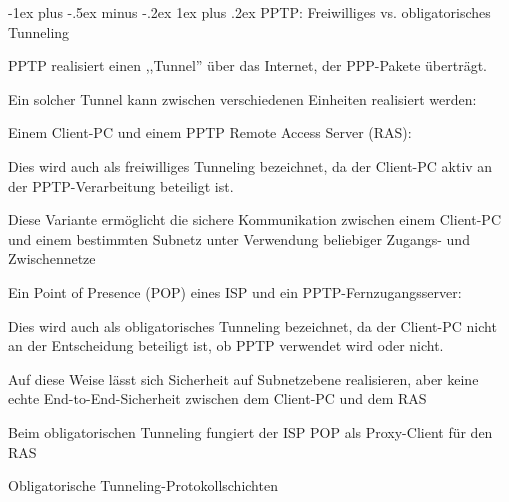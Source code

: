\documentclass[a4paper]{article}
\makeatletter
\renewcommand{\subsubsection}{\@startsection{subsubsection}{3}{0mm}%
 {-1ex plus -.5ex minus -.2ex}%
 {1ex plus .2ex}%
 {\normalfont\small\bfseries}}
\makeatother
\begin{document}
\begin{multicols}{3}
      \subsubsection{PPTP: Freiwilliges vs. obligatorisches Tunneling}
      \begin{itemize*}
            \item PPTP realisiert einen ,,Tunnel'' über das Internet, der PPP-Pakete überträgt.
            \item Ein solcher Tunnel kann zwischen verschiedenen Einheiten realisiert werden:
            \begin{itemize*}
                  \item Einem Client-PC und einem PPTP Remote Access Server (RAS):
                  \begin{itemize*}
                        \item Dies wird auch als freiwilliges Tunneling bezeichnet, da der Client-PC aktiv an der PPTP-Verarbeitung beteiligt ist.
                        \item Diese Variante ermöglicht die sichere Kommunikation zwischen einem Client-PC und einem bestimmten Subnetz unter Verwendung beliebiger Zugangs- und Zwischennetze
                  \end{itemize*}
                  \item Ein Point of Presence (POP) eines ISP und ein PPTP-Fernzugangsserver:
                  \begin{itemize*}
                        \item Dies wird auch als obligatorisches Tunneling bezeichnet, da der Client-PC nicht an der Entscheidung beteiligt ist, ob PPTP verwendet wird oder nicht.
                        \item Auf diese Weise lässt sich Sicherheit auf Subnetzebene realisieren, aber keine echte End-to-End-Sicherheit zwischen dem Client-PC und dem RAS
                        \item Beim obligatorischen Tunneling fungiert der ISP POP als Proxy-Client für den RAS
                  \end{itemize*}
            \end{itemize*}
      \end{itemize*}

      Obligatorische Tunneling-Protokollschichten


\end{multicols}
\end{document}
